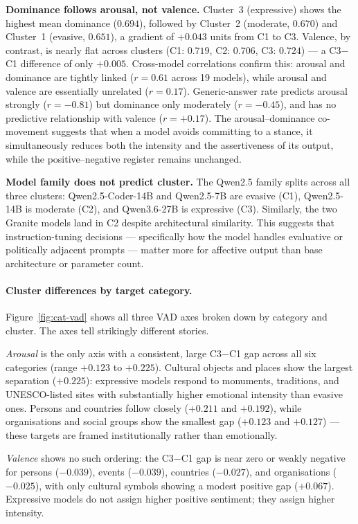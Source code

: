 \documentclass[runningheads,a4paper]{llncs}
\begin{document}
\textbf{Dominance follows arousal, not valence.}
Cluster~3 (expressive) shows the highest mean dominance ($0.694$),
followed by Cluster~2 (moderate, $0.670$) and Cluster~1 (evasive, $0.651$),
a gradient of $+0.043$ units from C1 to C3.
Valence, by contrast, is nearly flat across clusters
(C1: $0.719$, C2: $0.706$, C3: $0.724$) --- a C3$-$C1 difference of only $+0.005$.
Cross-model correlations confirm this: arousal and dominance are tightly linked
($r = 0.61$ across 19 models), while arousal and valence are essentially unrelated
($r = 0.17$).
Generic-answer rate predicts arousal strongly ($r = -0.81$) but dominance only
moderately ($r = -0.45$), and has no predictive relationship with valence ($r = +0.17$).
The arousal--dominance co-movement suggests that when a model avoids committing
to a stance, it simultaneously reduces both the intensity and the assertiveness of
its output, while the positive--negative register remains unchanged.

\textbf{Model family does not predict cluster.}
The Qwen2.5 family splits across all three clusters:
Qwen2.5-Coder-14B and Qwen2.5-7B are evasive (C1), Qwen2.5-14B is moderate (C2),
and Qwen3.6-27B is expressive (C3).
Similarly, the two Granite models land in C2 despite architectural similarity.
This suggests that instruction-tuning decisions --- specifically how the model
handles evaluative or politically adjacent prompts --- matter more for affective
output than base architecture or parameter count.

\paragraph{Cluster differences by target category.}
Figure~\ref{fig:cat-vad} shows all three VAD axes broken down by category and cluster.
The axes tell strikingly different stories.

\emph{Arousal} is the only axis with a consistent, large C3$-$C1 gap across all six
categories (range $+0.123$ to $+0.225$).
Cultural objects and places show the largest separation ($+0.225$):
expressive models respond to monuments, traditions, and UNESCO-listed sites with
substantially higher emotional intensity than evasive ones.
Persons and countries follow closely ($+0.211$ and $+0.192$), while organisations
and social groups show the smallest gap ($+0.123$ and $+0.127$) --- these targets
are framed institutionally rather than emotionally.

\emph{Valence} shows no such ordering: the C3$-$C1 gap is near zero or weakly
negative for persons ($-0.039$), events ($-0.039$), countries ($-0.027$), and
organisations ($-0.025$), with only cultural symbols showing a modest positive gap
($+0.067$).
Expressive models do not assign higher positive sentiment; they assign higher intensity.
\end{document}
